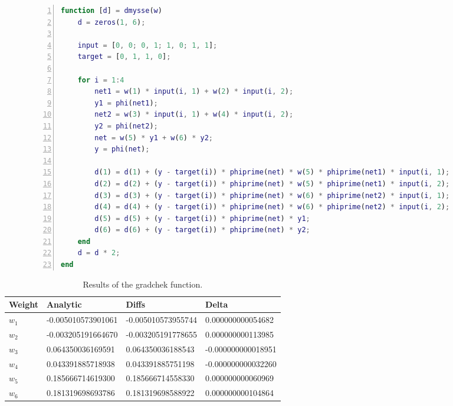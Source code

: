 \documentclass{article}
\begin{document}
\begin{figure}
	\begin{lstlisting}[caption={The computation of the derivatives of the sum squared error of the weights.}, label={listing:dmysse}, captionpos=b, language=matlab, numbers=left, tabsize=4, frame=single, basicstyle=\footnotesize, breaklines=true, deletekeywords={input, zeros}]
function [d] = dmysse(w)
	d = zeros(1, 6);

	input = [0, 0; 0, 1; 1, 0; 1, 1];
	target = [0, 1, 1, 0];

	for i = 1:4
		net1 = w(1) * input(i, 1) + w(2) * input(i, 2);
		y1 = phi(net1);
		net2 = w(3) * input(i, 1) + w(4) * input(i, 2);
		y2 = phi(net2);
		net = w(5) * y1 + w(6) * y2; 
		y = phi(net);
	
		d(1) = d(1) + (y - target(i)) * phiprime(net) * w(5) * phiprime(net1) * input(i, 1);
		d(2) = d(2) + (y - target(i)) * phiprime(net) * w(5) * phiprime(net1) * input(i, 2);
		d(3) = d(3) + (y - target(i)) * phiprime(net) * w(6) * phiprime(net2) * input(i, 1);
		d(4) = d(4) + (y - target(i)) * phiprime(net) * w(6) * phiprime(net2) * input(i, 2);
		d(5) = d(5) + (y - target(i)) * phiprime(net) * y1;
		d(6) = d(6) + (y - target(i)) * phiprime(net) * y2;
	end
	d = d * 2;
end
	\end{lstlisting}
\end{figure}

\begin{table}[!h]
	\centering
	\begin{tabular}{| l | l | l | l |}
		\hline
		Weight & Analytic & Diffs & Delta \\ \hline
$w_1$ & -0.005010573901061 & -0.005010573955744 & 0.000000000054682 \\ \hline
$w_2$ & -0.003205191664670 & -0.003205191778655 & 0.000000000113985 \\ \hline
$w_3$ & 0.064350036169591 & 0.064350036188543 & -0.000000000018951 \\ \hline
$w_4$ & 0.043391885718938 & 0.043391885751198 & -0.000000000032260 \\ \hline
$w_5$ & 0.185666714619300 & 0.185666714558330 & 0.000000000060969 \\ \hline
$w_6$ & 0.181319698693786 & 0.181319698588922 & 0.000000000104864 \\ \hline
	\end{tabular}
	\caption{Results of the gradchek function.}
	\label{table:gradchek}
\end{table}
\end{document}
